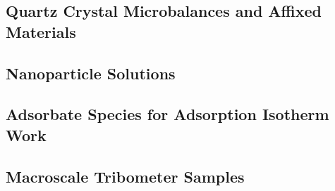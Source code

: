 \subsection{Quartz Crystal Microbalances and Affixed Materials}

\subsection{Nanoparticle Solutions}

\subsection{Adsorbate Species for Adsorption Isotherm Work}

\subsection{Macroscale Tribometer Samples}


 





